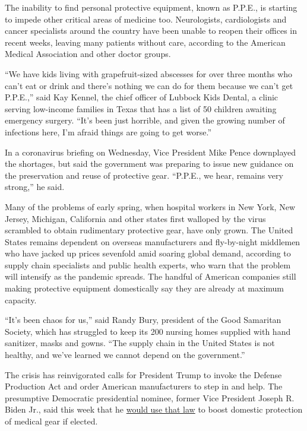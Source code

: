 The inability to find personal protective equipment, known as P.P.E., is
starting to impede other critical areas of medicine too. Neurologists,
cardiologists and cancer specialists around the country have been unable
to reopen their offices in recent weeks, leaving many patients without
care, according to the American Medical Association and other doctor
groups.

``We have kids living with grapefruit-sized abscesses for over three
months who can't eat or drink and there's nothing we can do for them
because we can't get P.P.E.,'' said Kay Kennel, the chief officer of
Lubbock Kids Dental, a clinic serving low-income families in Texas that
has a list of 50 children awaiting emergency surgery. ``It's been just
horrible, and given the growing number of infections here, I'm afraid
things are going to get worse.''

In a coronavirus briefing on Wednesday, Vice President Mike Pence
downplayed the shortages, but said the government was preparing to issue
new guidance on the preservation and reuse of protective gear. ``P.P.E.,
we hear, remains very strong,'' he said.

Many of the problems of early spring, when hospital workers in New York,
New Jersey, Michigan, California and other states first walloped by the
virus scrambled to obtain rudimentary protective gear, have only grown.
The United States remains dependent on overseas manufacturers and
fly-by-night middlemen who have jacked up prices sevenfold amid soaring
global demand, according to supply chain specialists and public health
experts, who warn that the problem will intensify as the pandemic
spreads. The handful of American companies still making protective
equipment domestically say they are already at maximum capacity.

``It's been chaos for us,'' said Randy Bury, president of the Good
Samaritan Society, which has struggled to keep its 200 nursing homes
supplied with hand sanitizer, masks and gowns. ``The supply chain in the
United States is not healthy, and we've learned we cannot depend on the
government.''

The crisis has reinvigorated calls for President Trump to invoke the
Defense Production Act and order American manufacturers to step in and
help. The presumptive Democratic presidential nominee, former Vice
President Joseph R. Biden Jr., said this week that he
\href{https://www.documentcloud.org/documents/6982369-Biden-Supply-Chain-Fact-Sheet-07-07-20.html?utm_source=newsletter\&utm_medium=email\&utm_campaign=newsletter_axiosvitals\&stream=top}{would
use that law} to boost domestic protection of medical gear if elected.


